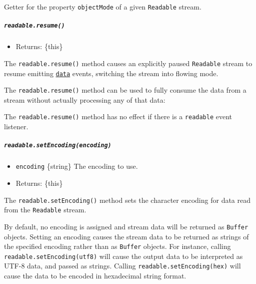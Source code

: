 Getter for the property \texttt{objectMode} of a given \texttt{Readable}
stream.

\subparagraph{\texorpdfstring{\texttt{readable.resume()}}{readable.resume()}}\label{readable.resume}

\begin{itemize}
\tightlist
\item
  Returns: \{this\}
\end{itemize}

The \texttt{readable.resume()} method causes an explicitly paused
\texttt{Readable} stream to resume emitting
\hyperref[event-data]{\texttt{\textquotesingle{}data\textquotesingle{}}}
events, switching the stream into flowing mode.

The \texttt{readable.resume()} method can be used to fully consume the
data from a stream without actually processing any of that data:

\begin{Shaded}
\begin{Highlighting}[]
\NormalTok{()}
  \NormalTok{()}
  \NormalTok{(}\OperatorTok{,}\NormalTok{ () }\KeywordTok{=\textgreater{}}\NormalTok{ \{}
    \NormalTok{(}\NormalTok{)}\OperatorTok{;}
\NormalTok{  \})}\OperatorTok{;}
\end{Highlighting}
\end{Shaded}

The \texttt{readable.resume()} method has no effect if there is a
\texttt{\textquotesingle{}readable\textquotesingle{}} event listener.

\subparagraph{\texorpdfstring{\texttt{readable.setEncoding(encoding)}}{readable.setEncoding(encoding)}}\label{readable.setencodingencoding}

\begin{itemize}
\tightlist
\item
  \texttt{encoding} \{string\} The encoding to use.
\item
  Returns: \{this\}
\end{itemize}

The \texttt{readable.setEncoding()} method sets the character encoding
for data read from the \texttt{Readable} stream.

By default, no encoding is assigned and stream data will be returned as
\texttt{Buffer} objects. Setting an encoding causes the stream data to
be returned as strings of the specified encoding rather than as
\texttt{Buffer} objects. For instance, calling
\texttt{readable.setEncoding(\textquotesingle{}utf8\textquotesingle{})}
will cause the output data to be interpreted as UTF-8 data, and passed
as strings. Calling
\texttt{readable.setEncoding(\textquotesingle{}hex\textquotesingle{})}
will cause the data to be encoded in hexadecimal string format.

